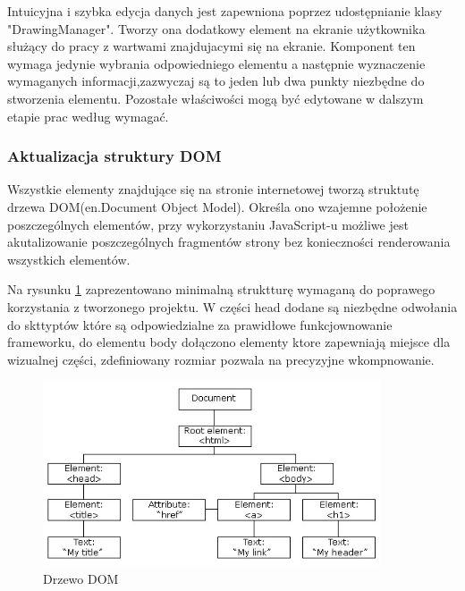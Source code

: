 Intuicyjna i szybka edycja danych jest zapewniona poprzez udostępnianie klasy "DrawingManager". Tworzy ona dodatkowy element na ekranie użytkownika służący do pracy z wartwami znajdujacymi się na ekranie. Komponent ten wymaga jedynie wybrania odpowiedniego elementu a następnie wyznaczenie wymaganych informacji,zazwyczaj są to jeden lub dwa punkty niezbędne do stworzenia elementu. Pozostałe właściwości mogą być edytowane w dalszym etapie prac według wymagać.

\subsubsection{Aktualizacja struktury DOM}
\label{subsubsec:dom}

Wszystkie elementy znajdujące się na stronie internetowej tworzą struktutę drzewa DOM(en.Document Object Model). Określa ono wzajemne położenie poszczególnych elementów, przy wykorzystaniu JavaScript-u możliwe jest akutalizowanie poszczególnych fragmentów strony bez konieczności renderowania wszystkich elementów.

Na rysunku \ref{fig:domtree} zaprezentowano minimalną struktturę wymaganą do poprawego korzystania z tworzonego projektu. W części head dodane są niezbędne odwołania do skttyptów które są odpowiedzialne za prawidłowe funkcjownowanie frameworku, do elementu body dołączono elementy ktore zapewniają miejsce dla wizualnej części, zdefiniowany rozmiar pozwala na precyzyjne wkompnowanie. 

\begin{figure}[H]
  \centering
    \includegraphics[width=100mm]{ge/htmltree2.jpg}
  \caption{Drzewo DOM}
  \label{fig:domtree}
\end{figure}